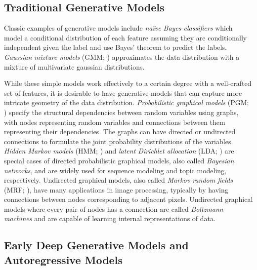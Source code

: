\subsection{Traditional Generative Models}

Classic examples of generative models include \emph{na\"{i}ve Bayes classifiers} \cite{maron1961naive} which model a conditional distribution of each feature assuming they are conditionally independent given the label and use Bayes' theorem to predict the labels.
\emph{Gaussian mixture models} (GMM; ) approximates the data distribution with a mixture of multivariate gaussian distributions.

While these simple models work effectively to a certain degree with a well-crafted set of features, it is desirable to have generative models that can capture more intricate geometry of the data distribution.
\emph{Probabilistic graphical models} (PGM; ) specify the structural dependencies between random variables using graphs, with nodes representing random variables and connections between them representing their dependencies.
The graphs can have directed or undirected connections to formulate the joint probability distributions of the variables.
\emph{Hidden Markov models} (HMM; ) and \emph{latent Dirichlet allocation} (LDA; ) are special cases of directed probabilistic graphical models, also called \emph{Bayesian networks}, and are widely used for sequence modeling and topic modeling, respectively.
Undirected graphical models, also called \emph{Markov random fields} (MRF; ), have many applications in image processing, typically by having connections between nodes corresponding to adjacent pixels.
Undirected graphical models where every pair of nodes has a connection are called \emph{Boltzmann machines} \cite{hinton1984boltzmann} and are capable of learning internal representations of data.

\subsection{Early Deep Generative Models and Autoregressive Models}

